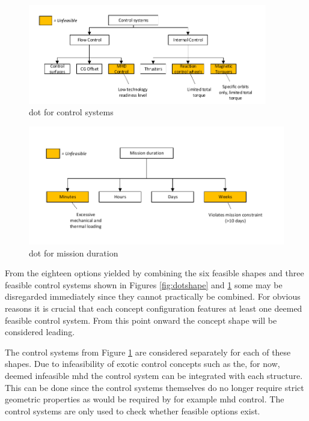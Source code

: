 \begin{figure}[H]
\centering
\includegraphics[width = 0.93\textwidth]{Figure/DOT_control.pdf}
\vspace{-5mm}
\caption{\acrlong{dot} for control systems}
\label{fig:dotcontrol}
\end{figure}

\begin{figure}[H]
\centering
\includegraphics[width = 1.0\textwidth]{Figure/DOT_missionduration.pdf}
\vspace{-5mm}
\caption{\acrlong{dot} for mission duration}
\label{fig:dotduration}
\end{figure}

From the eighteen options yielded by combining the six feasible shapes and three feasible control systems shown in Figures \ref{fig:dotshape} and \ref{fig:dotcontrol} some may be disregarded immediately since they cannot practically be combined. For obvious reasons it is crucial that each concept configuration features at least one deemed feasible control system. From this point onward the concept shape will be considered leading. 

The control systems from Figure  \ref{fig:dotcontrol} are considered separately for each of these shapes. Due to infeasibility of exotic control concepts such as the, for now, deemed infeasible \gls{mhd} the control system can be integrated with each structure. This can be done since the control systems themselves do no longer require strict geometric properties as would be required by for example \gls{mhd} control. The control systems are only used to check whether feasible options exist.

